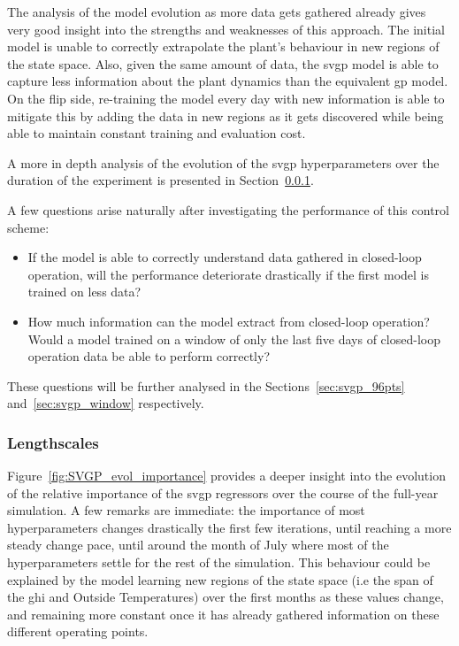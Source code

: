 The analysis of the model evolution as more data gets gathered already gives
very good insight into the strengths and weaknesses of this approach. The
initial model is unable to correctly extrapolate the plant's behaviour in new
regions of the state space. Also, given the same amount of data, the
\acrshort{svgp} model is able to capture less information about the plant
dynamics than the equivalent \acrshort{gp} model. On the flip side, re-training
the model every day with new information is able to mitigate this by adding the
data in new regions as it gets discovered while being able to maintain constant
training and evaluation cost.

A more in depth analysis of the evolution of the \acrshort{svgp} hyperparameters
over the duration of the experiment is presented in
Section~\ref{sec:lengthscales_results}.

A few questions arise naturally after investigating the performance of this
control scheme: 

\begin{itemize}
    \item If the model is able to correctly understand data gathered in
        closed-loop operation, will the performance deteriorate drastically if
        the first model is trained on less data?
    \item How much information can the model extract from closed-loop operation?
        Would a model trained on a window of only the last five days of 
        closed-loop operation data be able to perform correctly?
\end{itemize}

These questions will be further analysed in the Sections~\ref{sec:svgp_96pts}
and~\ref{sec:svgp_window} respectively.

\clearpage

\subsubsection{Lengthscales}\label{sec:lengthscales_results}

Figure~\ref{fig:SVGP_evol_importance} provides a deeper insight into the
evolution of the relative importance of the \acrshort{svgp} regressors over the
course of the full-year simulation\footnotemark. A few remarks are immediate:
the importance of most hyperparameters changes drastically the first few
iterations, until reaching a more steady change pace, until around the month of
July where most of the hyperparameters settle for the rest of the simulation.
This behaviour could be explained by the model learning new regions of the state
space (i.e the span of the \acrshort{ghi} and Outside Temperatures) over the
first months as these values change, and remaining more constant once it has
already gathered information on these different operating points.

